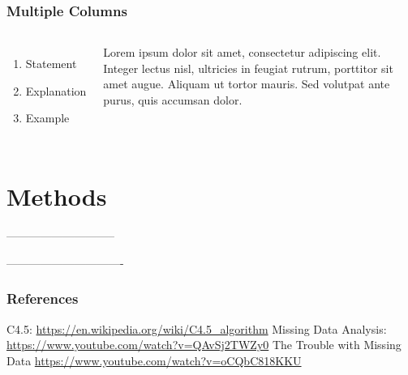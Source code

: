 \documentclass{beamer}
\begin{document}
\begin{frame}
\frametitle{Multiple Columns}
\begin{columns}[c] %


\begin{enumerate}
\item Statement
\item Explanation
\item Example
\end{enumerate}

Lorem ipsum dolor sit amet, consectetur adipiscing elit. Integer lectus nisl, ultricies in feugiat rutrum, porttitor sit amet augue. Aliquam ut tortor mauris. Sed volutpat ante purus, quis accumsan dolor.

\end{columns}
\end{frame}

\section{Methods}

-----------------------------



-------------------------------


\begin{frame}
\frametitle{References}
\footnotesize{
\begin{thebibliography}{9} %
C4.5: \url{https://en.wikipedia.org/wiki/C4.5_algorithm}
Missing Data Analysis: \url{https://www.youtube.com/watch?v=QAvSj2TWZy0}
The Trouble with Missing Data \url{https://www.youtube.com/watch?v=oCQbC818KKU}
\end{thebibliography}
}
\end{frame}



\end{document}
